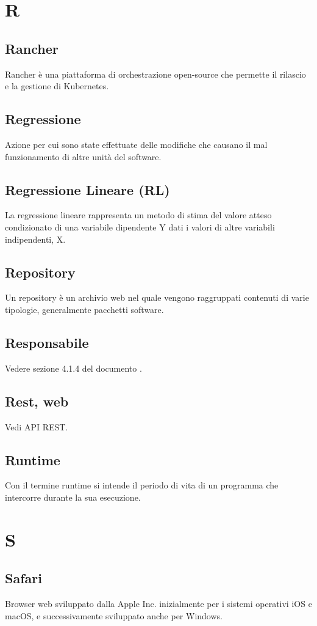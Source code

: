 \newpage \section{R}
\subsection{Rancher}  Rancher è una piattaforma di orchestrazione open-source che permette il rilascio e la gestione di Kubernetes.
\subsection{Regressione}  Azione per cui sono state effettuate delle modifiche che causano il mal funzionamento di altre unità del software.
\subsection{Regressione Lineare (RL)}  La regressione lineare rappresenta un metodo di stima del valore atteso condizionato di una variabile dipendente Y dati i valori di altre variabili indipendenti, X.
\subsection{Repository}  Un repository è un archivio web nel quale vengono raggruppati contenuti di varie tipologie, generalmente pacchetti software.
\subsection{Responsabile}  Vedere sezione 4.1.4 del documento .
\subsection{Rest, web }  Vedi API REST.
\subsection{Runtime}  Con il termine runtime si intende il periodo di vita di un programma che intercorre durante la sua esecuzione.

\newpage \section{S}
\subsection{Safari} Browser web sviluppato dalla Apple Inc. inizialmente per i sistemi operativi iOS e macOS, e successivamente sviluppato anche per Windows.
